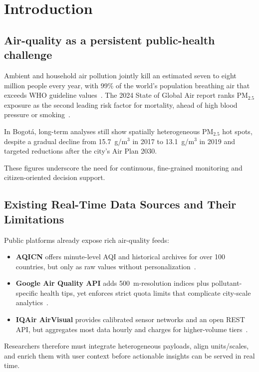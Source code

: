\section{Introduction}

\subsection{Air-quality as a persistent public-health challenge}

Ambient and household air pollution jointly kill an estimated seven to eight million people every year, with 99\% of the world’s population breathing air that exceeds WHO guideline values~\cite{whopollution}. The 2024 State of Global Air report ranks PM$_{2.5}$ exposure as the second leading risk factor for mortality, ahead of high blood pressure or smoking~\cite{state}. 

In Bogotá, long-term analyses still show spatially heterogeneous PM$_{2.5}$ hot spots, despite a gradual decline from 15.7~\textmu g/m$^3$ in 2017 to 13.1~\textmu g/m$^3$ in 2019 and targeted reductions after the city’s Air Plan 2030.

These figures underscore the need for continuous, fine-grained monitoring and citizen-oriented decision support.

\subsection{Existing Real-Time Data Sources and Their Limitations}

Public platforms already expose rich air-quality feeds:
\begin{itemize}
    \item \textbf{AQICN} offers minute-level AQI and historical archives for over 100 countries, but only as raw values without personalization~\cite{aqicn}.
    \item \textbf{Google Air Quality API} adds 500~m-resolution indices plus pollutant-specific health tips, yet enforces strict quota limits that complicate city-scale analytics~\cite{google}.
    \item \textbf{IQAir AirVisual} provides calibrated sensor networks and an open REST API, but aggregates most data hourly and charges for higher-volume tiers~\cite{iqair}.
\end{itemize}

Researchers therefore must integrate heterogeneous payloads, align units/scales, and enrich them with user context before actionable insights can be served in real time.

